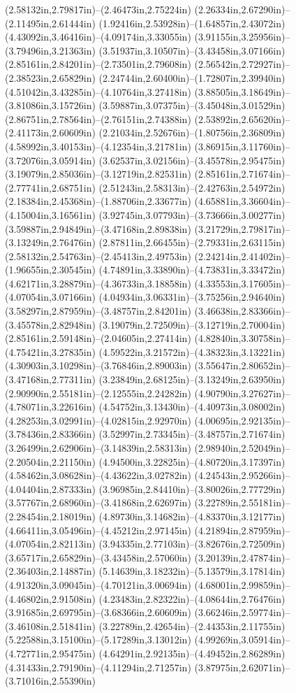 (2.58132in,2.79817in)--(2.46473in,2.75224in) (2.26334in,2.67290in)--(2.11495in,2.61444in) (1.92416in,2.53928in)--(1.64857in,2.43072in) (4.43092in,3.46416in)--(4.09174in,3.33055in) (3.91155in,3.25956in)--(3.79496in,3.21363in) (3.51937in,3.10507in)--(3.43458in,3.07166in) (2.85161in,2.84201in)--(2.73501in,2.79608in) (2.56542in,2.72927in)--(2.38523in,2.65829in) (2.24744in,2.60400in)--(1.72807in,2.39940in) (4.51042in,3.43285in)--(4.10764in,3.27418in) (3.88505in,3.18649in)--(3.81086in,3.15726in) (3.59887in,3.07375in)--(3.45048in,3.01529in) (2.86751in,2.78564in)--(2.76151in,2.74388in) (2.53892in,2.65620in)--(2.41173in,2.60609in) (2.21034in,2.52676in)--(1.80756in,2.36809in) (4.58992in,3.40153in)--(4.12354in,3.21781in) (3.86915in,3.11760in)--(3.72076in,3.05914in) (3.62537in,3.02156in)--(3.45578in,2.95475in) (3.19079in,2.85036in)--(3.12719in,2.82531in) (2.85161in,2.71674in)--(2.77741in,2.68751in) (2.51243in,2.58313in)--(2.42763in,2.54972in) (2.18384in,2.45368in)--(1.88706in,2.33677in) (4.65881in,3.36604in)--(4.15004in,3.16561in) (3.92745in,3.07793in)--(3.73666in,3.00277in) (3.59887in,2.94849in)--(3.47168in,2.89838in) (3.21729in,2.79817in)--(3.13249in,2.76476in) (2.87811in,2.66455in)--(2.79331in,2.63115in) (2.58132in,2.54763in)--(2.45413in,2.49753in) (2.24214in,2.41402in)--(1.96655in,2.30545in) (4.74891in,3.33890in)--(4.73831in,3.33472in) (4.62171in,3.28879in)--(4.36733in,3.18858in) (4.33553in,3.17605in)--(4.07054in,3.07166in) (4.04934in,3.06331in)--(3.75256in,2.94640in) (3.58297in,2.87959in)--(3.48757in,2.84201in) (3.46638in,2.83366in)--(3.45578in,2.82948in) (3.19079in,2.72509in)--(3.12719in,2.70004in) (2.85161in,2.59148in)--(2.04605in,2.27414in) (4.82840in,3.30758in)--(4.75421in,3.27835in) (4.59522in,3.21572in)--(4.38323in,3.13221in) (4.30903in,3.10298in)--(3.76846in,2.89003in) (3.55647in,2.80652in)--(3.47168in,2.77311in) (3.23849in,2.68125in)--(3.13249in,2.63950in) (2.90990in,2.55181in)--(2.12555in,2.24282in) (4.90790in,3.27627in)--(4.78071in,3.22616in) (4.54752in,3.13430in)--(4.40973in,3.08002in) (4.28253in,3.02991in)--(4.02815in,2.92970in) (4.00695in,2.92135in)--(3.78436in,2.83366in) (3.52997in,2.73345in)--(3.48757in,2.71674in) (3.26499in,2.62906in)--(3.14839in,2.58313in) (2.98940in,2.52049in)--(2.20504in,2.21150in) (4.94500in,3.22825in)--(4.80720in,3.17397in) (4.58462in,3.08628in)--(4.43622in,3.02782in) (4.24543in,2.95266in)--(4.04404in,2.87333in) (3.96985in,2.84410in)--(3.80026in,2.77729in) (3.57767in,2.68960in)--(3.41868in,2.62697in) (3.22789in,2.55181in)--(2.28454in,2.18019in) (4.89730in,3.14682in)--(4.83370in,3.12177in) (4.66411in,3.05496in)--(4.45212in,2.97145in) (4.21894in,2.87959in)--(4.07054in,2.82113in) (3.94335in,2.77103in)--(3.82676in,2.72509in) (3.65717in,2.65829in)--(3.43458in,2.57060in) (3.20139in,2.47874in)--(2.36403in,2.14887in) (5.14639in,3.18232in)--(5.13579in,3.17814in) (4.91320in,3.09045in)--(4.70121in,3.00694in) (4.68001in,2.99859in)--(4.46802in,2.91508in) (4.23483in,2.82322in)--(4.08644in,2.76476in) (3.91685in,2.69795in)--(3.68366in,2.60609in) (3.66246in,2.59774in)--(3.46108in,2.51841in) (3.22789in,2.42654in)--(2.44353in,2.11755in) (5.22588in,3.15100in)--(5.17289in,3.13012in) (4.99269in,3.05914in)--(4.72771in,2.95475in) (4.64291in,2.92135in)--(4.49452in,2.86289in) (4.31433in,2.79190in)--(4.11294in,2.71257in) (3.87975in,2.62071in)--(3.71016in,2.55390in) 
